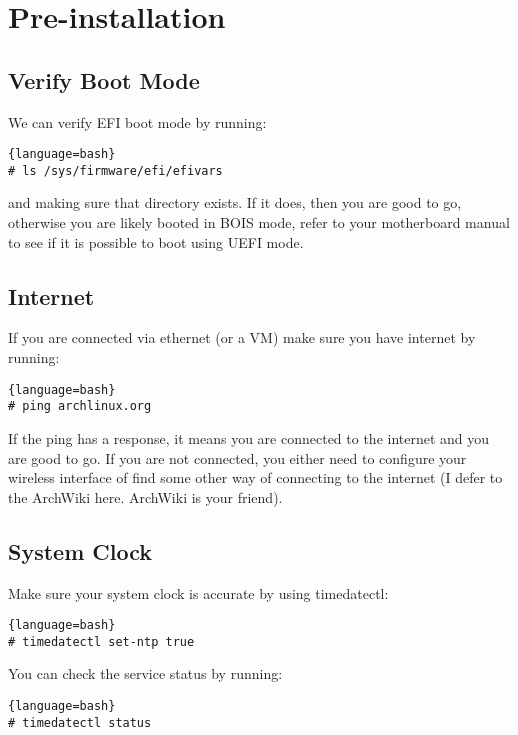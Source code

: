 \section{Pre-installation}
\subsection{Verify Boot Mode}
We can verify EFI boot mode by running:
\begin{lstlisting}{language=bash}
# ls /sys/firmware/efi/efivars
\end{lstlisting}
and making sure that directory exists.
If it does, then you are good to go, otherwise you are likely booted in BOIS mode, refer to your motherboard manual to see if it is possible to boot using UEFI mode.

\subsection{Internet}
If you are connected via ethernet (or a VM) make sure you have internet by running:
\begin{lstlisting}{language=bash}
# ping archlinux.org
\end{lstlisting}
If the ping has a response, it means you are connected to the internet and you are good to go. If you are not connected, you either need to configure your wireless interface of find some other way of connecting to the internet (I defer to the ArchWiki here. ArchWiki is your friend).

\subsection{System Clock}
Make sure your system clock is accurate by using timedatectl:
\begin{lstlisting}{language=bash}
# timedatectl set-ntp true
\end{lstlisting}
You can check the service status by running:
\begin{lstlisting}{language=bash}
# timedatectl status
\end{lstlisting}